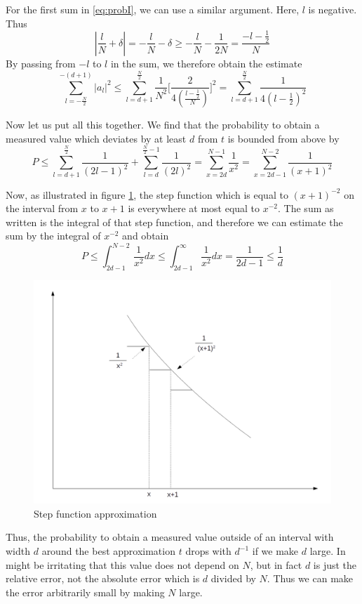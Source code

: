 \documentclass[a4paper, draft]{article}
\theoremstyle{own}
\theoremstyle{remark}
\begin{document}
For the first sum in \eqref{eq:probI}, we can use a similar argument. Here, $l$ is negative. Thus
$$
| \frac{l}{N} + \delta  |  = - \frac{l}{N} - \delta  \geq - \frac{l}{N} - \frac{1}{2N} =  \frac{-l -\frac{1}{2}}{N}
$$
By passing from $-l$ to $l$ in the sum, we therefore obtain the estimate
$$
\sum_{l=-\frac{N}{2}}^{-(d+1)} |a_l|^2 \leq 
\sum_{l=d+1}^{\frac{N}{2}} \frac{1}{N^2} 
\big[    \frac{2}{4(\frac{l - \frac{1}{2}}{N})}   \big]^2
= 
\sum_{l=d+1}^{\frac{N}{2}} \frac{1}{4(l - \frac{1}{2})^2}
$$

Now let us put all this together. We find that the probability to obtain a measured value which deviates by at least $d$ from $t$ is bounded from above by
$$
P \leq \sum_{l=d+1}^{\frac{N}{2}} \frac{1}{(2l - 1)^2} 
+
\sum_{l=d}^{\frac{N}{2}-1} \frac{1}{(2l)^2} 
=
\sum_{x = 2d}^{N-1} \frac{1}{x^2} =  \sum_{x = 2d-1}^{N-2} \frac{1}{(x+1)^2}
$$

Now, as illustrated in figure \ref{fig:RiemannSum}, the step function which is equal to $(x+1)^{-2}$ on the interval from $x$ to $x+1$ is everywhere at most equal to $x^{-2}$. The sum as written is the integral of that step function, and therefore we can estimate the sum by the integral of $x^{-2}$ and obtain
$$
P \leq \int_{2d-1}^{N-2} \frac{1}{x^2} dx \leq \int_{2d-1}^{\infty} \frac{1}{x^2} dx = \frac{1}{2d-1} \leq \frac{1}{d}
$$


\begin{figure}[ht]
\centering
\includegraphics[width=0.7\linewidth]{images/RiemannSum}
\caption[Step function approximation]{Step function approximation}
\label{fig:RiemannSum}
\end{figure}

Thus, the probability to obtain a measured value outside of an interval with width $d$ around the best approximation $t$ drops with $d^{-1}$ if we make $d$ large. In might be irritating that this value does not depend on $N$, but in fact $d$ is just the relative error, not the absolute error which is $d$ divided by $N$. Thus we can make the error arbitrarily small by making $N$ large.
\end{document}
